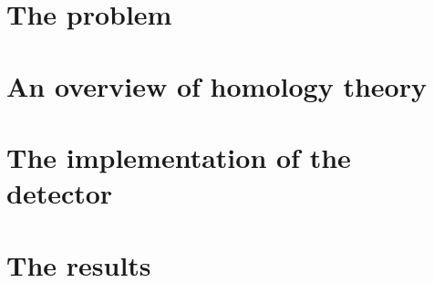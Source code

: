 \documentclass[12pt, oneside]{book}
\begin{document}
\chapter{The problem}\label{ch:problem}


\chapter{An overview of homology theory}\label{ch:theory}


\chapter{The implementation of the detector}\label{ch:implementation}


\chapter{The results}\label{ch:results}


\backmatter
\pagestyle{plain}
\printbibliography
\end{document}
